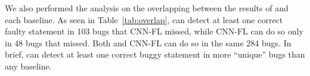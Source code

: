 We also performed the analysis on the overlapping between the results
of {\tool} and each baseline. As seen in Table~\ref{tab:overlap},
{\tool} can detect at least one correct faulty statement in 103 bugs
that CNN-FL missed, while CNN-FL can do so only in 48 bugs that
{\tool} missed.
Both {\tool} and CNN-FL can do so in the same 284 bugs. In
brief, {\tool} can detect at least one correct buggy statement in more
``unique'' bugs than any baseline.











